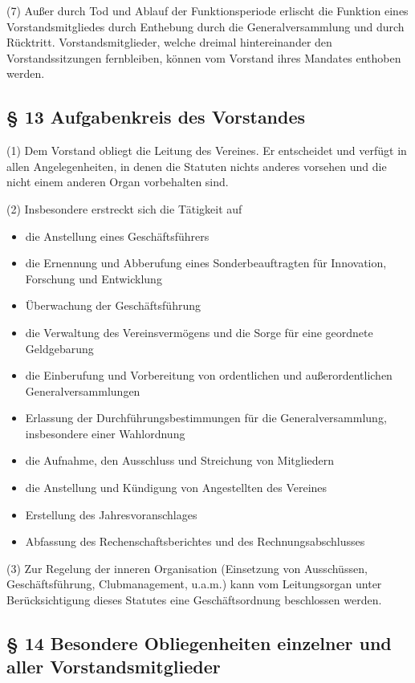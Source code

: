 \documentclass[10pt,a4paper]{article}
\begin{document}
(7)
Außer durch Tod und Ablauf der Funktionsperiode erlischt die Funktion eines Vorstandsmitgliedes durch Enthebung durch die Generalversammlung und durch Rücktritt.
Vorstandsmitglieder, welche dreimal hintereinander den Vorstandssitzungen fernbleiben, können vom Vorstand ihres Mandates enthoben werden.

\subsection{§ 13
Aufgabenkreis des Vorstandes}

(1)
Dem Vorstand obliegt die Leitung des Vereines.
Er entscheidet und verfügt in allen Angelegenheiten, in denen die Statuten nichts anderes vorsehen und die nicht einem anderen Organ vorbehalten sind.

(2)
Insbesondere erstreckt sich die Tätigkeit auf
\begin{itemize}
\renewcommand\labelitemi{-}
\item
die Anstellung eines Geschäftsführers
\item
die Ernennung und Abberufung eines Sonderbeauftragten für Innovation, Forschung und Entwicklung
\item
Überwachung der Geschäftsführung
\item
die Verwaltung des Vereinsvermögens und die Sorge für eine geordnete Geldgebarung
\item
die Einberufung und Vorbereitung von ordentlichen und außerordentlichen Generalversammlungen
\item
Erlassung der Durchführungsbestimmungen für die Generalversammlung, insbesondere einer Wahlordnung
\item
die Aufnahme, den Ausschluss und Streichung von Mitgliedern
\item
die Anstellung und Kündigung von Angestellten des Vereines
\item
Erstellung des Jahresvoranschlages
\item
Abfassung des Rechenschaftsberichtes und des Rechnungsabschlusses
\end{itemize}

(3)
Zur Regelung der inneren Organisation (Einsetzung von Ausschüssen, Geschäftsführung, Clubmanagement, u.a.m.) kann vom Leitungsorgan unter Berücksichtigung dieses Statutes eine Geschäftsordnung beschlossen werden.

\subsection{§ 14
Besondere Obliegenheiten einzelner und aller Vorstandsmitglieder}
\end{document}
